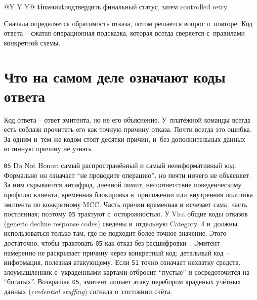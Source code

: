 \begin{table}[tbp]
{\begin{minipage}{\fullwidth}
\begin{tabularx}{\fullwidth}{@{}Y Y Y@{}}
        \newline\textbf{timeout}\newline подтвердить финальный статус,
        затем controlled retry \\
        \bottomrule
      \end{tabularx}
      \par\smallskip
    \end{minipage}%
  }
  \endgroup
  \caption{Рабочая классификация кодов ответа по следующему действию.}\label{fig:decline-codes}
\end{table}

Сначала определяется обратимость
отказа, потом решается вопрос о~повторе. Код ответа --
сжатая операционная подсказка,
которая всегда сверяется с~правилами конкретной схемы.

\section{Что на самом деле означают коды ответа}\label{sec:decline-response-codes}

Код ответа -- ответ эмитента, но не его объяснение. У~платёжной
команды всегда есть соблазн прочитать его как точную причину отказа.
Почти всегда это ошибка. За одним и~тем же кодом стоят десятки причин,
и~без дополнительных данных истинную причину не узнать.

\texttt{05} Do Not Honor: самый распространённый и самый неинформативный
код. Формально он означает \enquote{не проводите операцию}, но почти ничего не
объясняет. За ним скрываются антифрод, дневной лимит, несоответствие
поведенческому профилю клиента, временная блокировка в~приложении или
внутренняя политика эмитента по конкретному MCC. Часть причин
временная и исчезает сама, часть постоянная; поэтому
\texttt{05} трактуют с~осторожностью. У Visa общие коды отказов (generic decline
response codes) сведены в~отдельную Category~4 и~должны использоваться
только там, где не подходит более точное значение. Этого достаточно,
чтобы трактовать \texttt{05} как отказ без расшифровки~\cite{visa-core-rules}.
Эмитент намеренно не раскрывает причину через конкретный код: детальный
код -- информация, полезная атакующему. Если \texttt{51} точно
означает нехватку средств, злоумышленник с~украденными картами отбросит
\enquote{пустые} и сосредоточится на \enquote{богатых}. Возвращая \texttt{05},
эмитент лишает атаку перебором краденых учётных данных (\textit{credential stuffing}) сигнала о~состоянии счёта.

